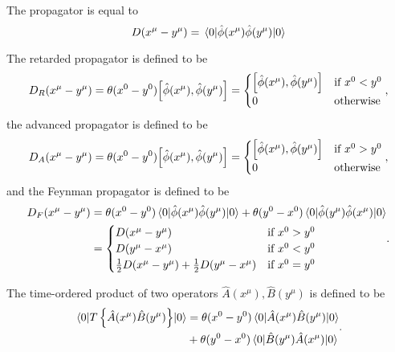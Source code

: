 \begin{lemma}\label{thm:qkg_propagator_correlation_function}
	The propagator is equal to
	\begin{equation}
		D(x^\mu-y^\mu)
		=
		\expval{\hat\phi(x^\mu)\hat\phi(y^\mu)}{0}
	\end{equation}
\end{lemma}
\begin{definition}
	The retarded propagator is defined to be
	\begin{equation}
		D_R(x^\mu-y^\mu)
		=
		\theta(x^0-y^0)
		\comm{\hat\phi(x^\mu)}{\hat\phi(y^\mu)}
		=
		\begin{cases}
			\comm{\hat\phi(x^\mu)}{\hat\phi(y^\mu)}	& \text{if}\ x^0<y^0
			\\
			0 & \text{otherwise}
		\end{cases}
		,
	\end{equation}
	the advanced propagator is defined to be
	\begin{equation}
		D_A(x^\mu-y^\mu)
		=
		\theta(x^0-y^0)
		\comm{\hat\phi(x^\mu)}{\hat\phi(y^\mu)}
		=
		\begin{cases}
			\comm{\hat\phi(x^\mu)}{\hat\phi(y^\mu)}	& \text{if}\ x^0>y^0
			\\
			0 & \text{otherwise}
		\end{cases}
		,
	\end{equation}
	and the Feynman propagator is defined to be
	\begin{equation}
		\begin{split}
			D_F(x^\mu-y^\mu)
			&=
			\theta(x^0-y^0)
			\expval{\hat\phi(x^\mu)\hat\phi(y^\mu)}{0}
			+
			\theta(y^0-x^0)
			\expval{\hat\phi(y^\mu)\hat\phi(x^\mu)}{0}
			\\
			&=
			\begin{cases}
				D(x^\mu-y^\mu) & \text{if}\ x^0>y^0 \\
				D(y^\mu-x^\mu) & \text{if}\ x^0<y^0 \\
				\frac{1}{2}
				D(x^\mu-y^\mu)
				+
				\frac{1}{2}
				D(y^\mu-x^\mu)
				& \text{if}\ x^0=y^0
			\end{cases}
		\end{split}
		.
	\end{equation}
\end{definition}
\begin{definition}
	The time-ordered product of two operators $\hat{A}(x^\mu),\hat{B}(y^\mu)$ is defined to be
	\begin{equation}
		\begin{split}
			\expval{T\left\{\hat{A}(x^\mu)\hat{B}(y^\mu)\right\}}{0}
			&=
			\theta(x^0-y^0)
			\expval{\hat{A}(x^\mu)\hat{B}(y^\mu)}{0}
			\\
			&+
			\theta(y^0-x^0)
			\expval{\hat{B}(y^\mu)\hat{A}(x^\mu)}{0}
		\end{split}
		.		
	\end{equation}
\end{definition}
